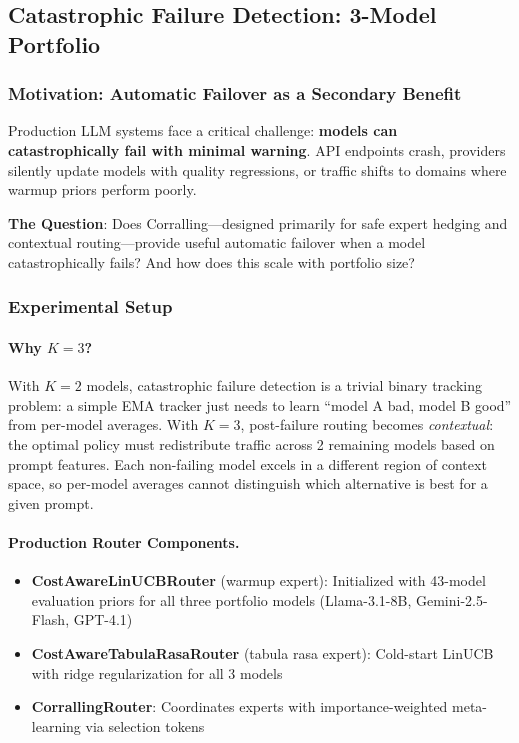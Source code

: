 
\subsection{Catastrophic Failure Detection: 3-Model Portfolio}
\label{appendix:catastrophic_failure}

\subsubsection{Motivation: Automatic Failover as a Secondary Benefit}

Production LLM systems face a critical challenge: \textbf{models can catastrophically fail with minimal warning}. API endpoints crash, providers silently update models with quality regressions, or traffic shifts to domains where warmup priors perform poorly.

\textbf{The Question}: Does Corralling---designed primarily for safe expert hedging and contextual routing---provide useful automatic failover when a model catastrophically fails? And how does this scale with portfolio size?

\subsubsection{Experimental Setup}

\paragraph{Why $K=3$?}
With $K=2$ models, catastrophic failure detection is a trivial binary tracking problem: a simple EMA tracker just needs to learn ``model A bad, model B good'' from per-model averages. With $K=3$, post-failure routing becomes \emph{contextual}: the optimal policy must redistribute traffic across 2 remaining models based on prompt features. Each non-failing model excels in a different region of context space, so per-model averages cannot distinguish which alternative is best for a given prompt.

\paragraph{Production Router Components.}
\begin{itemize}
    \item \textbf{CostAwareLinUCBRouter} (warmup expert): Initialized with 43-model evaluation priors for all three portfolio models (Llama-3.1-8B, Gemini-2.5-Flash, GPT-4.1)
    \item \textbf{CostAwareTabulaRasaRouter} (tabula rasa expert): Cold-start LinUCB with ridge regularization for all 3 models
    \item \textbf{CorrallingRouter}: Coordinates experts with importance-weighted meta-learning via selection tokens
\end{itemize}

